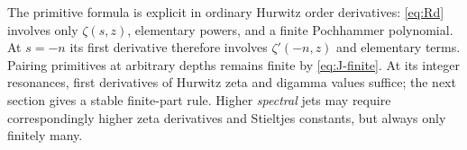 The primitive formula is explicit in ordinary Hurwitz order derivatives:
\eqref{eq:Rd} involves only $\zeta(s,z)$, elementary powers, and a finite
Pochhammer polynomial. At $s=-n$ its first derivative therefore involves
$\zeta'(-n,z)$ and elementary terms. Pairing primitives at arbitrary
depths remains finite by \eqref{eq:J-finite}. At its integer resonances,
first derivatives of Hurwitz zeta and digamma values suffice; the next
section gives a stable finite-part rule. Higher \emph{spectral} jets may
require correspondingly higher zeta derivatives and Stieltjes constants,
but always only finitely many.
